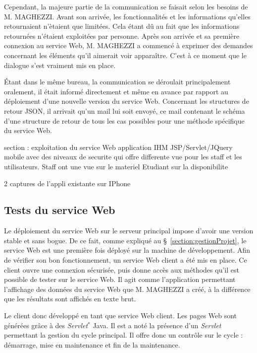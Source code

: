 Cependant, la majeure partie de la communication se faisait selon les besoins de M. MAGHEZZI.
Avant son arriv\'ee, les fonctionnalit\'es et les informations qu'elles retournaient n'\`etaient que limit\'ees.
Cela \'etant d\^u au fait que les informations retourn\'ees n'\'etaient exploit\'ees par personne.
Apr\`es son arriv\'ee et sa premi\`ere connexion au service Web, M. MAGHEZZI a commenc\'e \`a exprimer des demandes concernant les \'el\'ements qu'il aimerait voir appara\^itre.
C'est \`a ce moment que le dialogue s'est vraiment mis en place.

\'Etant dans le m\^eme bureau, la communication se d\'eroulait principalement oralement, il \'etait inform\'e directement et m\^eme en avance par rapport au d\'eploiement d'une nouvelle version du service Web.
Concernant les structures de retour JSON, il arrivait qu'un mail lui soit envoy\'e, ce mail contenant le sch\'ema d'une structure de retour de tous les cas possibles pour une m\'ethode sp\'ecifique du service Web.


section : exploitation du service Web
application IHM JSP/Servlet/JQuery mobile avec des niveaux de securite qui offre differente vue pour les staff et les utilisateurs.
Staff ont une vue sur le materiel
Etudiant sur la disponibilite

2 captures de l'appli existante sur IPhone

\subsection{Tests du service Web}

Le d\'eploiement du service Web sur le serveur principal impose d'avoir une version stable et sans bogue.
De ce fait, comme expliqu\'e au \S~\ref{section:gestionProjet}, le service Web est une premi\`ere fois d\'eploy\'e sur la machine de d\'eveloppement.
Afin de v\'erifier son bon fonctionnement, un service Web client a \'et\'e mis en place.
Ce client ouvre une connexion s\'ecuris\'ee, puis donne acc\`es aux m\'ethodes qu'il est possible de tester sur le service Web.
Il agit comme l'application permettant l'affichage des donn\'ees du service Web que M. MAGHEZZI a cr\'e\'e, \`a la diff\'erence que les r\'esultats sont affich\'es en texte brut.

Le client donc d\'evelopp\'e en tant que service Web client.
Les pages Web sont g\'en\'er\'ees gr\^ace \`a des \textit{Servlet}$^*$ Java.
Il est a not\'e la pr\'esence d'un \textit{Servlet} permettant la gestion du cycle principal.
Il offre donc un contr\^ole sur le cycle : d\'emarrage, mise en maintenance et fin de la maintenance.


